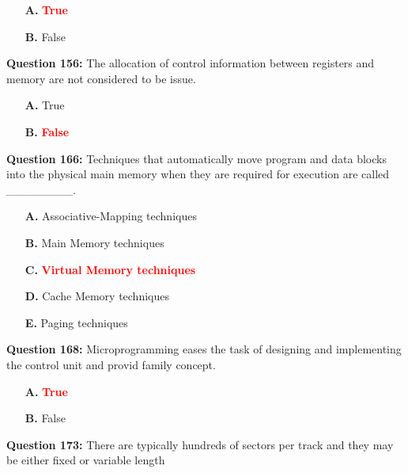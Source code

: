 \documentclass[12pt,a4paper]{article}
\begin{document}
\begin{itemize}
    \item[\textbf{A.}] \textcolor{red}{\textbf{True}}
    \item[\textbf{B.}] False
\end{itemize}

\vspace{0.5cm}

\textbf{Question 156:} The allocation of control information between registers and memory are not considered to be issue.

\begin{itemize}
    \item[\textbf{A.}] True
    \item[\textbf{B.}] \textcolor{red}{\textbf{False}}
\end{itemize}

\vspace{0.5cm}

\textbf{Question 166:} Techniques that automatically move program and data blocks into the physical main memory when they are required for execution are called ________.

\begin{itemize}
    \item[\textbf{A.}] Associative-Mapping techniques
    \item[\textbf{B.}] Main Memory techniques
    \item[\textbf{C.}] \textcolor{red}{\textbf{Virtual Memory techniques}}
    \item[\textbf{D.}] Cache Memory techniques
    \item[\textbf{E.}] Paging techniques
\end{itemize}

\vspace{0.5cm}

\textbf{Question 168:} Microprogramming eases the task of designing and implementing the control unit and provid family concept.

\begin{itemize}
    \item[\textbf{A.}] \textcolor{red}{\textbf{True}}
    \item[\textbf{B.}] False
\end{itemize}

\vspace{0.5cm}

\textbf{Question 173:} There are typically hundreds of sectors per track and they may be either fixed or variable length
\end{document}
